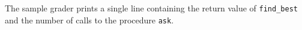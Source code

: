 The sample grader prints a single line containing the return value of \texttt{find\_best} and the number of calls to the procedure \texttt{ask}.